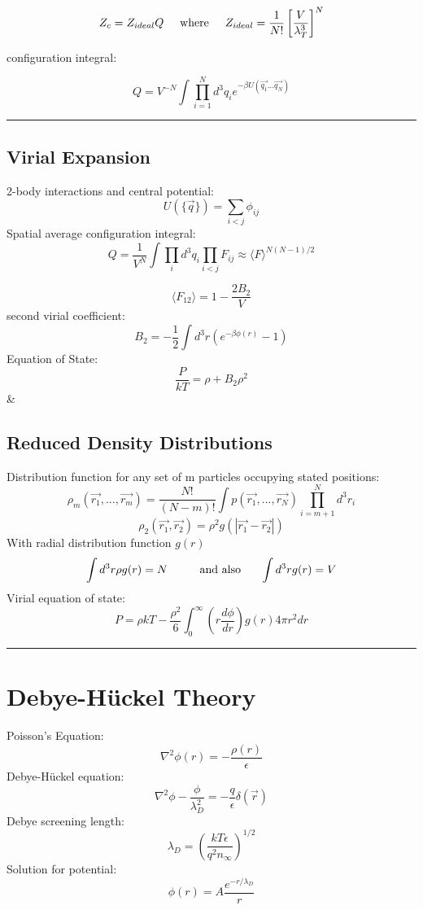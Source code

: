 \documentclass[table,cmyk]{article}
\begin{document}
\begin{longtable}
\[Z_c = Z_{ideal} Q \textmd{\hspace{0.5cm}where\hspace{0.5cm}} Z_{ideal} = \frac{1}{N!}\left[\frac{V}{\lambda_{T}^3}\right]^N\]

configuration integral:

\[Q = V^{-N}\int \prod_{i=1}^{N} d^3q_i e^{-\beta U(\vec{q_1}...\vec{q_N})}\]
\noindent\rule{7.8cm}{0.4pt}
\subsection*{Virial Expansion}
2-body interactions and central potential:
\[U(\{\vec{q}\}) = \sum_{i<j} \phi_{ij}\]
Spatial average configuration integral:
\[ Q = \frac{1}{V^N} \int \prod_{i} d^3q_i \prod_{i<j}F_{ij} \approx \langle F\rangle^{N(N-1)/2}\]

\[\langle F_{12} \rangle = 1 - \frac{2B_2}{V}\]
second virial coefficient:
\[B_2 = -\frac{1}{2} \int d^3r (e^{-\beta \phi(r)}-1)\]
Equation of State:
\[ \frac{P}{kT} = \rho + B_2 \rho^2\]
&
\subsection*{Reduced Density Distributions}
Distribution function for any set of m particles occupying stated positions:
\[\rho_m(\vec{r_1},...,\vec{r_m}) = \frac{N!}{(N-m)!}\int p(\vec{r_1},...,\vec{r_N}) \prod_{i=m+1}^{N} d^3r_i\]
\[\rho_2(\vec{r_1},\vec{r_2}) = \rho^2g(|\vec{r_1}-\vec{r_2}|)\]
With radial distribution function $g(r)$
\[ \int d^3r\rho g(r) = N \textmd{\hspace{1cm}and also\hspace{0.6cm}} \int d^3rg(r) = V\]
Virial equation of state:
\[P = \rho kT - \frac{\rho^2}{6} \int_{0}^{\infty} \left( r \frac{d\phi}{dr}\right) g(r) 4\pi r^2 dr\]
\noindent\rule{7.8cm}{0.4pt}
\section*{Debye-H\"uckel Theory}
Poisson's Equation:
\[\nabla ^2 \phi(r) = -\frac{\rho(r)}{\epsilon}\]
Debye-H\"uckel equation:
\[ \nabla^2 \phi - \frac{\phi}{\lambda_{D}^2} = -\frac{q}{\epsilon} \delta(\vec{r})\]
Debye screening length:
\[ \lambda_D = \left( \frac{kT\epsilon}{q^2n_{\infty}}\right)^{1/2}\]
Solution for potential:
\[ \phi(r) = A\frac{e^{-r/\lambda_D}}{r}\]
\tabularnewline\hline

\end{longtable}
\end{document}
